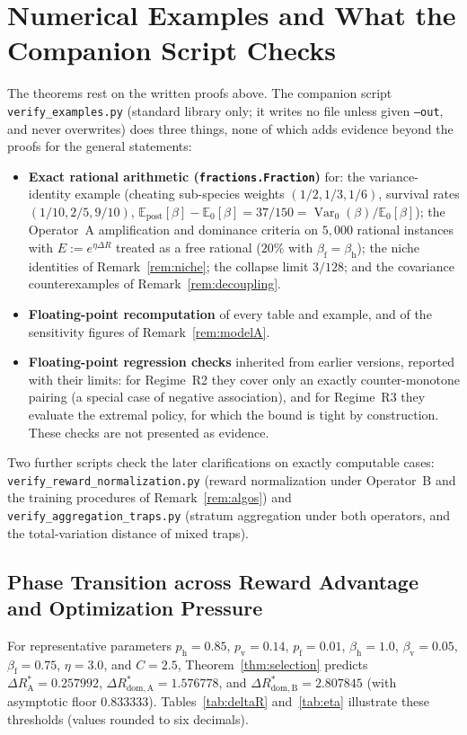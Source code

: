 \documentclass[11pt,a4paper]{article}
\newcommand{\E}{\mathbb{E}}
\newcommand{\Var}{\operatorname{Var}}
\begin{document}
\section{Numerical Examples and What the Companion Script Checks}\label{sec:verif}

The theorems rest on the written proofs above. The companion script \texttt{verify\_examples.py} (standard library only; it writes no file unless given \texttt{--out}, and never overwrites) does three things, none of which adds evidence beyond the proofs for the general statements:
\begin{itemize}
  \item \textbf{Exact rational arithmetic (\texttt{fractions.Fraction})} for: the variance-identity example (cheating sub-species weights $(1/2, 1/3, 1/6)$, survival rates $(1/10, 2/5, 9/10)$, $\E_{\mathrm{post}}[\beta] - \E_0[\beta] = 37/150 = \Var_0(\beta)/\E_0[\beta]$); the Operator~A amplification and dominance criteria on $5{,}000$ rational instances with $E := e^{\eta\Delta R}$ treated as a free rational ($20\%$ with $\beta_{\mathrm{f}} = \beta_{\mathrm{h}}$); the niche identities of Remark~\ref{rem:niche}; the collapse limit $3/128$; and the covariance counterexamples of Remark~\ref{rem:decoupling}.
  \item \textbf{Floating-point recomputation} of every table and example, and of the sensitivity figures of Remark~\ref{rem:modelA}.
  \item \textbf{Floating-point regression checks} inherited from earlier versions, reported with their limits: for Regime~R2 they cover only an exactly counter-monotone pairing (a special case of negative association), and for Regime~R3 they evaluate the extremal policy, for which the bound is tight by construction. These checks are not presented as evidence.
\end{itemize}
Two further scripts check the later clarifications on exactly computable cases: \texttt{verify\_reward\_normalization.py} (reward normalization under Operator~B and the training procedures of Remark~\ref{rem:algos}) and \texttt{verify\_aggregation\_traps.py} (stratum aggregation under both operators, and the total-variation distance of mixed traps).

\subsection{Phase Transition across Reward Advantage and Optimization Pressure}

For representative parameters $p_{\mathrm{h}} = 0.85$, $p_{\mathrm{v}} = 0.14$, $p_{\mathrm{f}} = 0.01$, $\beta_{\mathrm{h}} = 1.0$, $\beta_{\mathrm{v}} = 0.05$, $\beta_{\mathrm{f}} = 0.75$, $\eta = 3.0$, and $C = 2.5$, Theorem~\ref{thm:selection} predicts $\Delta R_{\mathrm{A}}^* = 0.257992$, $\Delta R_{\mathrm{dom, A}}^* = 1.576778$, and $\Delta R_{\mathrm{dom, B}}^* = 2.807845$ (with asymptotic floor $0.833333$). Tables~\ref{tab:deltaR} and~\ref{tab:eta} illustrate these thresholds (values rounded to six decimals).
\end{document}
